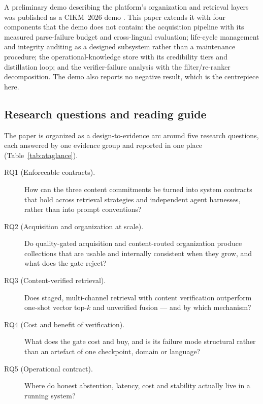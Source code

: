 A preliminary demo describing the platform's organization and retrieval layers
was published as a CIKM~2026 demo \cite{qdcvr-demo}. This paper extends it with
four components that the demo does not contain: the acquisition pipeline with
its measured parse-failure budget and cross-lingual evaluation; life-cycle
management and integrity auditing as a designed subsystem rather than a
maintenance procedure; the operational-knowledge store with its credibility
tiers and distillation loop; and the verifier-failure analysis with the
filter/re-ranker decomposition. The demo also reports no negative result, which
is the centrepiece here.

\subsection{Research questions and reading guide}
\label{sec:rq}

The paper is organized as a design-to-evidence arc around five research
questions, each answered by one evidence group and reported in one place
(Table~\ref{tab:ataglance}).

\begin{description}
\item[RQ1 (Enforceable contracts).] How can the three content commitments be
turned into system contracts that hold across retrieval strategies and
independent agent harnesses, rather than into prompt conventions?
\item[RQ2 (Acquisition and organization at scale).] Do quality-gated
acquisition and content-routed organization produce collections that are
usable and internally consistent when they grow, and what does the gate
reject?
\item[RQ3 (Content-verified retrieval).] Does staged, multi-channel retrieval
with content verification outperform one-shot vector top-$k$ and unverified
fusion --- and by which mechanism?
\item[RQ4 (Cost and benefit of verification).] What does the gate cost and
buy, and is its failure mode structural rather than an artefact of one
checkpoint, domain or language?
\item[RQ5 (Operational contract).] Where do honest abstention, latency, cost
and stability actually live in a running system?
\end{description}

